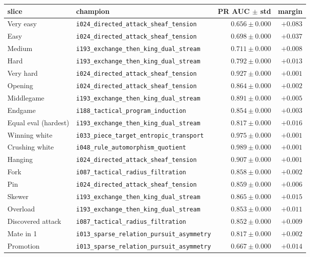 \documentclass[10pt,a4paper]{article}
\begin{document}
\begin{footnotesize}
\begin{tabularx}{\linewidth}{@{}p{2.4cm} L r r@{}}
\toprule
\textbf{slice} & \textbf{champion} & \textbf{PR AUC} $\pm$ \textbf{std} & \textbf{margin} \\
\midrule
Very easy & \texttt{i024\_directed\_attack\_sheaf\_tension} & $\mathbf{0.656} \pm 0.000$ & $+0.083$ \\
Easy & \texttt{i024\_directed\_attack\_sheaf\_tension} & $\mathbf{0.698} \pm 0.000$ & $+0.037$ \\
Medium & \texttt{i193\_exchange\_then\_king\_dual\_stream} & $\mathbf{0.711} \pm 0.000$ & $+0.008$ \\
Hard & \texttt{i193\_exchange\_then\_king\_dual\_stream} & $\mathbf{0.792} \pm 0.000$ & $+0.013$ \\
Very hard & \texttt{i024\_directed\_attack\_sheaf\_tension} & $\mathbf{0.927} \pm 0.000$ & $+0.001$ \\
Opening & \texttt{i024\_directed\_attack\_sheaf\_tension} & $\mathbf{0.864} \pm 0.000$ & $+0.002$ \\
Middlegame & \texttt{i193\_exchange\_then\_king\_dual\_stream} & $\mathbf{0.891} \pm 0.000$ & $+0.005$ \\
Endgame & \texttt{i188\_tactical\_program\_induction} & $\mathbf{0.854} \pm 0.000$ & $+0.003$ \\
Equal eval (hardest) & \texttt{i193\_exchange\_then\_king\_dual\_stream} & $\mathbf{0.817} \pm 0.000$ & $+0.016$ \\
Winning white & \texttt{i033\_piece\_target\_entropic\_transport} & $\mathbf{0.975} \pm 0.000$ & $+0.001$ \\
Crushing white & \texttt{i048\_rule\_automorphism\_quotient} & $\mathbf{0.989} \pm 0.000$ & $+0.001$ \\
Hanging & \texttt{i024\_directed\_attack\_sheaf\_tension} & $\mathbf{0.907} \pm 0.000$ & $+0.001$ \\
Fork & \texttt{i087\_tactical\_radius\_filtration} & $\mathbf{0.858} \pm 0.000$ & $+0.002$ \\
Pin & \texttt{i024\_directed\_attack\_sheaf\_tension} & $\mathbf{0.859} \pm 0.000$ & $+0.006$ \\
Skewer & \texttt{i193\_exchange\_then\_king\_dual\_stream} & $\mathbf{0.865} \pm 0.000$ & $+0.015$ \\
Overload & \texttt{i193\_exchange\_then\_king\_dual\_stream} & $\mathbf{0.853} \pm 0.000$ & $+0.011$ \\
Discovered attack & \texttt{i087\_tactical\_radius\_filtration} & $\mathbf{0.852} \pm 0.000$ & $+0.009$ \\
Mate in 1 & \texttt{i013\_sparse\_relation\_pursuit\_asymmetry} & $\mathbf{0.817} \pm 0.000$ & $+0.002$ \\
Promotion & \texttt{i013\_sparse\_relation\_pursuit\_asymmetry} & $\mathbf{0.667} \pm 0.000$ & $+0.014$ \\
\bottomrule
\end{tabularx}
\end{footnotesize}
\end{document}
